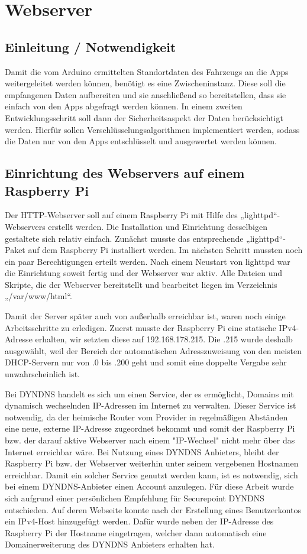 \section{Webserver}
\subsection{Einleitung / Notwendigkeit}
Damit die vom Arduino ermittelten Standortdaten des Fahrzeugs an die Apps weitergeleitet werden können, benötigt es eine Zwischeninstanz. Diese soll die empfangenen Daten aufbereiten und sie anschließend so bereitstellen, dass sie einfach von den Apps abgefragt werden können.
In einem zweiten Entwicklungsschritt soll dann der Sicherheitsaspekt der Daten berücksichtigt werden. Hierfür sollen Verschlüsselungsalgorithmen implementiert werden, sodass die Daten nur von den Apps entschlüsselt und ausgewertet werden können.

\subsection{Einrichtung des Webservers auf einem Raspberry Pi}
Der HTTP-Webserver soll auf einem Raspberry Pi mit Hilfe des „lighttpd“-Webservers erstellt werden. Die Installation und Einrichtung desselbigen gestaltete sich relativ einfach. Zunächst musste das entsprechende „lighttpd“-Paket auf dem Raspberry Pi installiert werden. Im nächsten Schritt mussten noch ein paar Berechtigungen erteilt werden. Nach einem Neustart von lighttpd war die Einrichtung soweit fertig und der Webserver war aktiv. Alle Dateien und Skripte, die der Webserver bereitstellt und bearbeitet liegen im Verzeichnis „/var/www/html“.

Damit der Server später auch von außerhalb erreichbar ist, waren noch einige Arbeitsschritte zu erledigen. Zuerst musste der Raspberry Pi eine statische IPv4-Adresse erhalten, wir setzten diese auf 192.168.178.215. Die .215 wurde deshalb ausgewählt, weil der Bereich der automatischen Adresszuweisung von den meisten DHCP-Servern nur von .0 bis .200 geht und somit eine doppelte Vergabe sehr unwahrscheinlich ist.

Bei DYNDNS handelt es sich um einen Service, der es ermöglicht, Domains mit dynamisch wechselnden IP-Adressen im Internet zu verwalten. Dieser Service ist notwendig, da der heimische Router vom Provider in regelmäßigen Abständen eine neue, externe IP-Adresse zugeordnet bekommt und somit der Raspberry Pi bzw. der darauf aktive Webserver nach einem "IP-Wechsel" nicht mehr über das Internet erreichbar wäre. Bei Nutzung eines DYNDNS Anbieters, bleibt der Raspberry Pi bzw. der Webserver weiterhin unter seinem vergebenen Hostnamen erreichbar. Damit ein solcher Service genutzt werden kann, ist es notwendig, sich bei einem DYNDNS-Anbieter einen Account anzulegen. Für diese Arbeit wurde sich aufgrund einer persönlichen Empfehlung für Securepoint DYNDNS entschieden. Auf deren Webseite konnte nach der Erstellung eines Benutzerkontos ein IPv4-Host hinzugefügt werden. Dafür wurde neben der IP-Adresse des Raspberry Pi der Hostname eingetragen, welcher dann automatisch eine Domainerweiterung des DYNDNS Anbieters erhalten hat.

